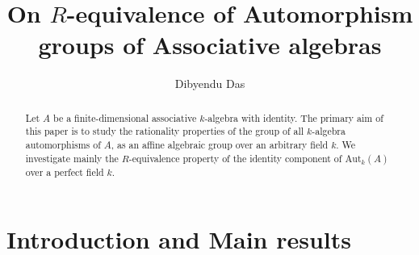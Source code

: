 \documentclass[12pt]{amsart}
\newcommand{\newsection}[1]{\setcounter{equation}{0} \section{#1}}
\theoremstyle{definition}
\numberwithin{equation}{section}
\begin{document}
	
	
\title{On $R$-equivalence of Automorphism groups of Associative algebras}
	
	
	
\author[Das]{Dibyendu Das}
\address{Indian Statistical Institute, Statistics and Mathematics Unit, 8th Mile, Mysore Road, Bangalore, 560059,
India}
	
	
	
	
	
\begin{abstract}
Let $A$ be a finite-dimensional associative $k$-algebra with identity. The primary aim of this paper is to study the rationality properties of the group of all $k$-algebra automorphisms of $A$, as an affine algebraic group over an arbitrary field $k$. We investigate mainly the $R$-equivalence property of the identity component of $\mathrm{Aut}_{k}(A)$ over a perfect field $k$.
\end{abstract}
	
\maketitle


\tableofcontents

	
\newsection{Introduction and Main results }\label{sec: intro}
\end{document}
